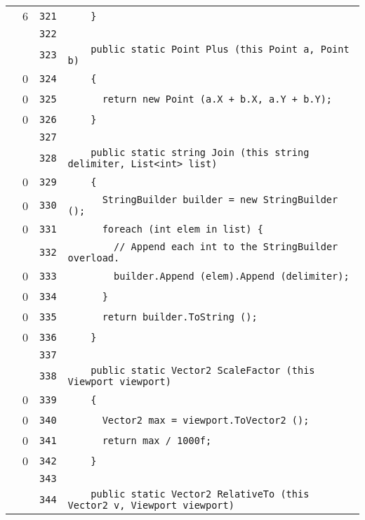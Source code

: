\documentclass[a4paper,10pt]{article}
\begin{document}
\begin{longtable}[l]{lrrl}
\cellcolor{green} & 6 & \verb~321~ & \verb~    }~\\
\cellcolor{gray} &  & \verb~322~ & \verb~~\\
\cellcolor{gray} &  & \verb~323~ & \verb~    public static Point Plus (this Point a, Point b)~\\
\cellcolor{red} & 0 & \verb~324~ & \verb~    {~\\
\cellcolor{red} & 0 & \verb~325~ & \verb~      return new Point (a.X + b.X, a.Y + b.Y);~\\
\cellcolor{red} & 0 & \verb~326~ & \verb~    }~\\
\cellcolor{gray} &  & \verb~327~ & \verb~~\\
\cellcolor{gray} &  & \verb~328~ & \verb~    public static string Join (this string delimiter, List<int> list)~\\
\cellcolor{red} & 0 & \verb~329~ & \verb~    {~\\
\cellcolor{red} & 0 & \verb~330~ & \verb~      StringBuilder builder = new StringBuilder ();~\\
\cellcolor{red} & 0 & \verb~331~ & \verb~      foreach (int elem in list) {~\\
\cellcolor{gray} &  & \verb~332~ & \verb~        // Append each int to the StringBuilder overload.~\\
\cellcolor{red} & 0 & \verb~333~ & \verb~        builder.Append (elem).Append (delimiter);~\\
\cellcolor{red} & 0 & \verb~334~ & \verb~      }~\\
\cellcolor{red} & 0 & \verb~335~ & \verb~      return builder.ToString ();~\\
\cellcolor{red} & 0 & \verb~336~ & \verb~    }~\\
\cellcolor{gray} &  & \verb~337~ & \verb~~\\
\cellcolor{gray} &  & \verb~338~ & \verb~    public static Vector2 ScaleFactor (this Viewport viewport)~\\
\cellcolor{red} & 0 & \verb~339~ & \verb~    {~\\
\cellcolor{red} & 0 & \verb~340~ & \verb~      Vector2 max = viewport.ToVector2 ();~\\
\cellcolor{red} & 0 & \verb~341~ & \verb~      return max / 1000f;~\\
\cellcolor{red} & 0 & \verb~342~ & \verb~    }~\\
\cellcolor{gray} &  & \verb~343~ & \verb~~\\
\cellcolor{gray} &  & \verb~344~ & \verb~    public static Vector2 RelativeTo (this Vector2 v, Viewport viewport)~\\

\end{longtable}
\end{document}
